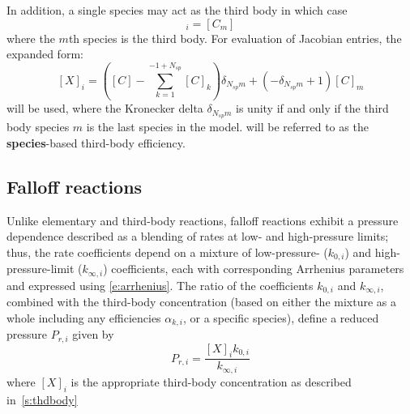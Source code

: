 \documentclass[12pt]{article}
\newcommand{\ns}{N_{sp}}
\begin{document}
In addition, a single species may act as the third body in which case
\begin{equation}
 [X]_{i} = [C_m]
\end{equation}
where the $m$th species is the third body.
For evaluation of Jacobian entries, the expanded form:
\begin{equation}
\label{e:thd_spec}
 [X]_{i}=\left([C] - \sum_{k=1}^{-1 + \ns} [C]_{k}\right) \delta_{\ns m} + \left(- \delta_{\ns m} + 1\right) [C]_{m}
\end{equation}
will be used, where the Kronecker delta $\delta_{\ns m}$ is unity if and only if the third body species $m$ is the last species in the model.
 will be referred to as the \textbf{species}-based third-body efficiency.


\subsection{Falloff reactions}
Unlike elementary and third-body reactions, falloff reactions exhibit a pressure dependence described as a blending of rates at low- and high-pressure limits; thus, the rate coefficients depend on a mixture of low-pressure- ($k_{0, i}$) and high-pressure-limit ($k_{\infty,i}$) coefficients, each with corresponding Arrhenius parameters and expressed using \cref{e:arrhenius}.
The ratio of the coefficients $k_{0, i}$ and $k_{\infty, i}$, combined with the third-body concentration (based on either the mixture as a whole including any efficiencies $\alpha_{k,i}$, or a specific species), define a reduced pressure $P_{r,i}$ given by
\begin{equation}
 \label{e:pr}
 P_{r, i}=\frac{[X]_{i} k_{0, i}}{k_{\infty, i}}
\end{equation}
where $[X]_{i}$ is the appropriate third-body concentration as described in~\cref{s:thdbody}
\end{document}
